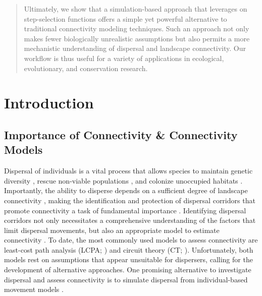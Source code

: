 \documentclass[abstract=on,10pt,a4paper,bibliography=totocnumbered]{article}
\begin{document}
\begin{abstract}
Ultimately, we show that a simulation-based approach that leverages on
step-selection functions offers a simple yet powerful alternative to traditional
connectivity modeling techniques. Such an approach not only makes fewer
biologically unrealistic assumptions but also permits a more mechanistic
understanding of dispersal and landscape connectivity. Our workflow is thus
useful for a variety of applications in ecological, evolutionary, and
conservation research.

\end{abstract}

\newpage

\onehalfspacing
\tableofcontents
\doublespacing

\newpage
{}


\section{Introduction}

\subsection{Importance of Connectivity \& Connectivity Models}
Dispersal of individuals is a vital process that allows species to maintain
genetic diversity \citep{Perrin.1999, Perrin.2000, Frankham.2002, Leigh.2012,
Baguette.2013}, rescue non-viable populations \citep{Brown.1977}, and colonize
unoccupied habitats \citep{Hanski.1999b, MacArthur.2001}. Importantly, the
ability to disperse depends on a sufficient degree of landscape connectivity
\citep{Fahrig.2003, Clobert.2012}, making the identification and protection of
dispersal corridors that promote connectivity a task of fundamental importance
\citep{Nathan.2008, Doerr.2011, Rudnick.2012}. Identifying dispersal corridors
not only necessitates a comprehensive understanding of the factors that limit
dispersal movements, but also an appropriate model to estimate connectivity
\citep{Baguette.2013, Vasudev.2015, Hofmann.2021}. To date, the most commonly
used models to assess connectivity are least-cost path analysis (LCPA;
\citealp{Adriaensen.2003}) and circuit theory (CT; \citealp{McRae.2006,
McRae.2008}). Unfortunately, both models rest on assumptions that appear
unsuitable for dispersers, calling for the development of alternative
approaches. One promising alternative to investigate dispersal and assess
connectivity is to simulate dispersal from individual-based movement models
\citep{Diniz.2019}.
\end{document}
